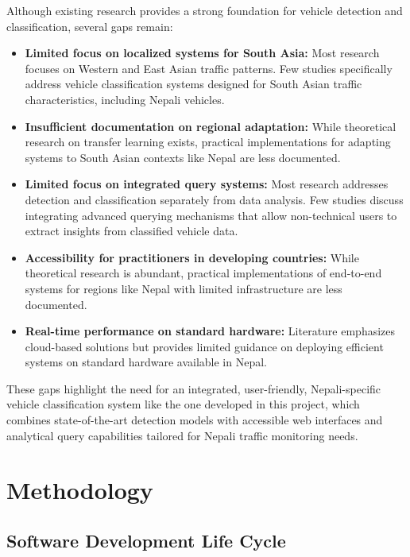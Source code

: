 \documentclass[12pt,a4paper]{report}
\begin{document}
Although existing research provides a strong foundation for vehicle detection and classification, several gaps remain:

\begin{itemize}
    \item \textbf{Limited focus on localized systems for South Asia:} Most research focuses on Western and East Asian traffic patterns. Few studies specifically address vehicle classification systems designed for South Asian traffic characteristics, including Nepali vehicles.
    
    \item \textbf{Insufficient documentation on regional adaptation:} While theoretical research on transfer learning exists, practical implementations for adapting systems to South Asian contexts like Nepal are less documented.
    
    \item \textbf{Limited focus on integrated query systems:} Most research addresses detection and classification separately from data analysis. Few studies discuss integrating advanced querying mechanisms that allow non-technical users to extract insights from classified vehicle data.
    
    \item \textbf{Accessibility for practitioners in developing countries:} While theoretical research is abundant, practical implementations of end-to-end systems for regions like Nepal with limited infrastructure are less documented.
    
    \item \textbf{Real-time performance on standard hardware:} Literature emphasizes cloud-based solutions but provides limited guidance on deploying efficient systems on standard hardware available in Nepal.
\end{itemize}

These gaps highlight the need for an integrated, user-friendly, Nepali-specific vehicle classification system like the one developed in this project, which combines state-of-the-art detection models with accessible web interfaces and analytical query capabilities tailored for Nepali traffic monitoring needs.

\chapter{Methodology}

\section{Software Development Life Cycle}
\end{document}
